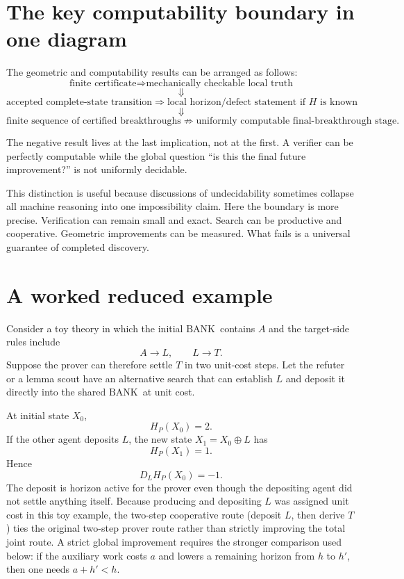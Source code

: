 \documentclass[11pt]{article}
\theoremstyle{remark}
\newcommand{\BANK}{\ensuremath{\mathrm{BANK}}}
\begin{document}
\section{The key computability boundary in one diagram}

The geometric and computability results can be arranged as follows:
\[
\boxed{\text{finite certificate}}
\Longrightarrow
\boxed{\text{mechanically checkable local truth}}
\]
\[
\Downarrow
\]
\[
\boxed{\text{accepted complete-state transition}}
\Longrightarrow
\boxed{\text{local horizon/defect statement if }H\text{ is known}}
\]
\[
\Downarrow
\]
\[
\boxed{\text{finite sequence of certified breakthroughs}}
\not\Longrightarrow
\boxed{\text{uniformly computable final-breakthrough stage}}.
\]

The negative result lives at the last implication, not at the first. A verifier can be perfectly computable while the global question ``is this the final future improvement?'' is not uniformly decidable.

This distinction is useful because discussions of undecidability sometimes collapse all machine reasoning into one impossibility claim. Here the boundary is more precise. Verification can remain small and exact. Search can be productive and cooperative. Geometric improvements can be measured. What fails is a universal guarantee of completed discovery.

\section{A worked reduced example}

Consider a toy theory in which the initial \BANK\ contains $A$ and the target-side rules include
\[
A\to L,
\qquad
L\to T.
\]
Suppose the prover can therefore settle $T$ in two unit-cost steps. Let the refuter or a lemma scout have an alternative search that can establish $L$ and deposit it directly into the shared \BANK\ at unit cost.

At initial state $X_0$,
\[
H_P(X_0)=2.
\]
If the other agent deposits $L$, the new state $X_1=X_0\oplus L$ has
\[
H_P(X_1)=1.
\]
Hence
\[
D_LH_P(X_0)=-1.
\]
The deposit is horizon active for the prover even though the depositing agent did not settle anything itself. Because producing and depositing $L$ was assigned unit cost in this toy example, the two-step cooperative route (deposit $L$, then derive $T$) ties the original two-step prover route rather than strictly improving the total joint route. A strict global improvement requires the stronger comparison used below: if the auxiliary work costs $a$ and lowers a remaining horizon from $h$ to $h'$, then one needs $a+h'<h$.
\end{document}
